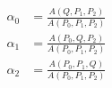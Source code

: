 \documentclass[border=6pt]{standalone}
\begin{document}
\color{black}
\(\displaystyle
\begin{aligned}
\alpha_0 &= \frac{A(Q,P_1,P_2)}{A(P_0,P_1,P_2)} \\
\alpha_1 &= \frac{A(P_0,Q,P_2)}{A(P_0,P_1,P_2)} \\
\alpha_2 &= \frac{A(P_0,P_1,Q)}{A(P_0,P_1,P_2)}
\end{aligned}
\)
\end{document}
